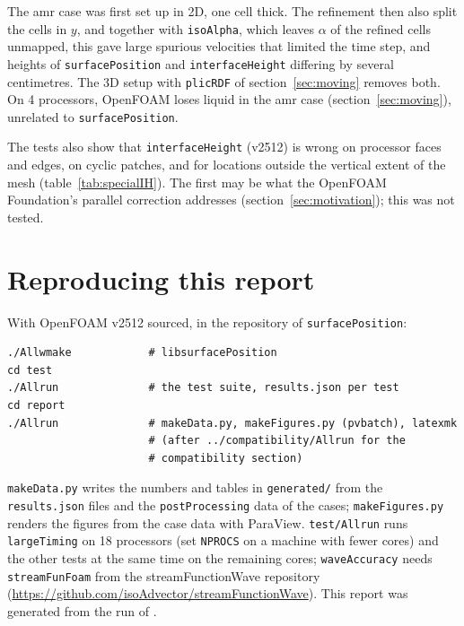 \documentclass[11pt,a4paper]{article}
\newcommand{\sP}{\texttt{surfacePosition}}
\newcommand{\iH}{\texttt{interfaceHeight}}
\begin{document}
The amr case was first set up in 2D, one cell thick. The refinement then
also split the cells in $y$, and together with \texttt{isoAlpha}, which
leaves $\alpha$ of the refined cells unmapped, this gave large spurious
velocities that limited the time step, and heights of \sP{} and \iH{}
differing by several centimetres. The 3D setup with \texttt{plicRDF} of
section~\ref{sec:moving} removes both. On 4 processors, OpenFOAM loses
liquid in the amr case (section~\ref{sec:moving}), unrelated to \sP{}.

The tests also show that \iH{} (v2512) is wrong on processor faces and edges,
on cyclic patches, and for locations outside the vertical extent of the mesh
(table~\ref{tab:specialIH}). The first may be what the OpenFOAM Foundation's
parallel correction addresses (section~\ref{sec:motivation}); this was not
tested.

\section{Reproducing this report}

With OpenFOAM v2512 sourced, in the repository of \sP{}:
\begin{lstlisting}
./Allwmake            # libsurfacePosition
cd test
./Allrun              # the test suite, results.json per test
cd report
./Allrun              # makeData.py, makeFigures.py (pvbatch), latexmk
                      # (after ../compatibility/Allrun for the
                      # compatibility section)
\end{lstlisting}
\texttt{makeData.py} writes the numbers and tables in \texttt{generated/}
from the \texttt{results.json} files and the \texttt{postProcessing} data of
the cases; \texttt{makeFigures.py} renders the figures from the case data with
ParaView. \texttt{test/Allrun} runs \texttt{largeTiming} on 18 processors
(set \texttt{NPROCS} on a machine with fewer cores) and the other tests at the
same time on the remaining cores; \texttt{waveAccuracy} needs
\texttt{streamFunFoam} from the streamFunctionWave repository
(\url{https://github.com/isoAdvector/streamFunctionWave}). This report was
generated from the run of \testRun.
\end{document}
